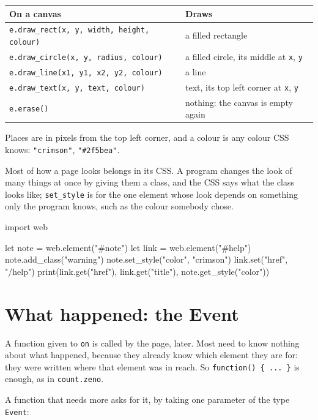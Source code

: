 \begin{center}
\begin{tabular}{lP{5.6cm}}
\toprule
On a canvas & Draws \\
\midrule
\verb|e.draw_rect(x, y, width, height, colour)| & a filled rectangle \\
\verb|e.draw_circle(x, y, radius, colour)| & a filled circle, its middle at \verb|x|, \verb|y| \\
\verb|e.draw_line(x1, y1, x2, y2, colour)| & a line \\
\verb|e.draw_text(x, y, text, colour)| & text, its top left corner at \verb|x|, \verb|y| \\
\verb|e.erase()| & nothing: the canvas is empty again \\
\bottomrule
\end{tabular}
\end{center}

Places are in pixels from the top left corner, and a
colour is any colour CSS knows: \verb|"crimson"|, \verb|"#2f5bea"|.

Most of how a page looks belongs in its CSS. A program changes the
look of many things at once by giving them a class, and the CSS says
what the class looks like; \verb|set_style| is for the one element
whose look depends on something only the program knows, such as the
colour somebody chose.

\begin{zeno}
import web

let note = web.element("#note")
let link = web.element("#help")
note.add_class("warning")
note.set_style("color", "crimson")
link.set("href", "/help")
print(link.get("href"), link.get("title"), note.get_style("color"))
\end{zeno}

\section{What happened: the Event}

A function given to \verb|on| is called by the page, later. Most need
to know nothing about what happened, because they already know which
element they are for: they were written where that element was in
reach. So \verb|function() { ... }| is enough, as in \verb|count.zeno|.

A function that needs more asks for it, by taking one parameter of the
type \verb|Event|:


